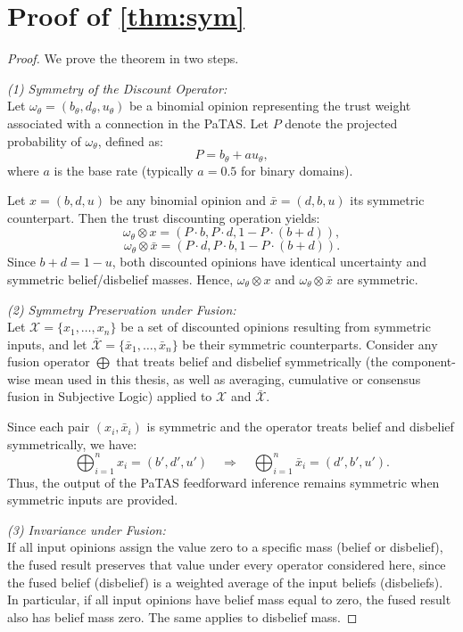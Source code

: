 \section{Proof of \cref{thm:sym}}
\begin{proof}
We prove the theorem in two steps.

\emph{(1) Symmetry of the Discount Operator:} \\
Let $\omega_\theta = (b_\theta, d_\theta, u_\theta)$ be a binomial opinion representing the trust weight associated with a connection in the PaTAS. Let $P$ denote the projected probability of $\omega_\theta$, defined as:
\[
P = b_\theta + a u_\theta,
\]
where $a$ is the base rate (typically $a = 0.5$ for binary domains).

Let $x = (b, d, u)$ be any binomial opinion and $\bar{x} = (d, b, u)$ its symmetric counterpart. Then the trust discounting operation yields:
\[
\omega_\theta \otimes x = (P \cdot b, P \cdot d, 1 - P \cdot (b + d)),
\]
\[
\omega_\theta \otimes \bar{x} = (P \cdot d, P \cdot b, 1 - P \cdot (b + d)).
\]
Since $b + d = 1 - u$, both discounted opinions have identical uncertainty and symmetric belief/disbelief masses. Hence, $\omega_\theta \otimes x$ and $\omega_\theta \otimes \bar{x}$ are symmetric.

\emph{(2) Symmetry Preservation under Fusion:} \\
Let $\mathcal{X} = \{x_1, \dots, x_n\}$ be a set of discounted opinions resulting from symmetric inputs, and let $\bar{\mathcal{X}} = \{\bar{x}_1, \dots, \bar{x}_n\}$ be their symmetric counterparts. Consider any fusion operator $\bigoplus$ that treats belief and disbelief symmetrically (the component-wise mean used in this thesis, as well as averaging, cumulative or consensus fusion in Subjective Logic) applied to $\mathcal{X}$ and $\bar{\mathcal{X}}$.

Since each pair $(x_i, \bar{x}_i)$ is symmetric and the operator treats belief and disbelief symmetrically, we have:
\[
\bigoplus_{i=1}^n x_i = (b', d', u') \quad \Rightarrow \quad \bigoplus_{i=1}^n \bar{x}_i = (d', b', u').
\]
Thus, the output of the PaTAS feedforward inference remains symmetric when symmetric inputs are provided.

\emph{(3) Invariance under Fusion:} \\
If all input opinions assign the value zero to a specific mass (belief or disbelief), the fused result preserves that value under every operator considered here, since the fused belief (disbelief) is a weighted average of the input beliefs (disbeliefs). In particular, if all input opinions have belief mass equal to zero, the fused result also has belief mass zero. The same applies to disbelief mass.


\end{proof}
